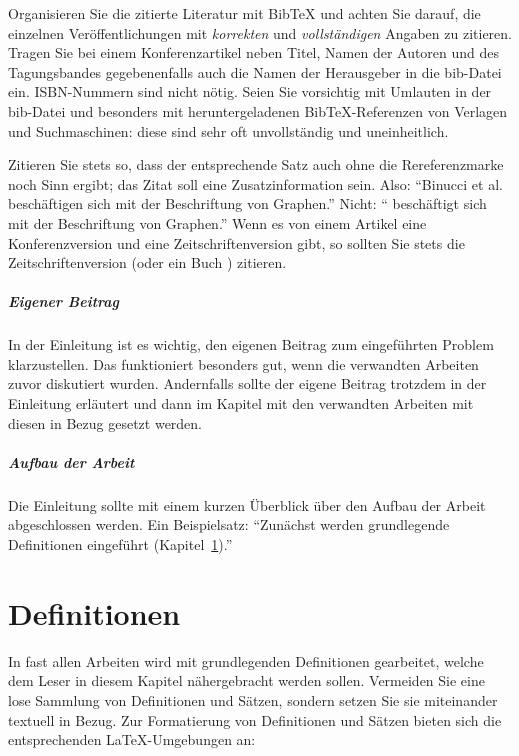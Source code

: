 \documentclass[bachelor,german]{info1thesis}
\begin{document}
Organisieren Sie die zitierte Literatur mit BibTeX und achten Sie darauf, die einzelnen Veröffentlichungen mit \emph{korrekten} und \emph{vollständigen} Angaben zu zitieren.
Tragen Sie bei einem Konferenzartikel neben Titel, Namen der Autoren und des Tagungsbandes gegebenenfalls auch die Namen der Herausgeber in die bib-Datei ein.
ISBN-Nummern sind nicht nötig.
Seien Sie vorsichtig mit Umlauten in der bib-Datei und besonders mit heruntergeladenen BibTeX-Referenzen von Verlagen und Suchmaschinen: diese sind sehr oft unvollständig und uneinheitlich.

Zitieren Sie stets so, dass der entsprechende Satz auch ohne die Rereferenzmarke noch Sinn ergibt; das Zitat soll eine Zusatzinformation sein. 
Also: "`Binucci et al.~\cite{bdln-odgvel-05} beschäftigen sich mit der Beschriftung von Graphen."'
Nicht: "`\cite{bdln-odgvel-05} beschäftigt sich mit der Beschriftung von Graphen."'
Wenn es von einem Artikel eine Konferenzversion \cite{bdln-lhod-02} und eine Zeitschriftenversion \cite{bdln-odgvel-05} gibt, so sollten Sie stets die Zeitschriftenversion (oder ein Buch \cite{gj-cigtn-79}) zitieren.


\paragraph{Eigener Beitrag}
In der Einleitung ist es wichtig, den eigenen Beitrag zum eingeführten Problem klarzustellen.
Das funktioniert besonders gut, wenn die verwandten Arbeiten zuvor diskutiert wurden. 
Andernfalls sollte der eigene Beitrag trotzdem in der Einleitung erläutert und dann im Kapitel mit den verwandten Arbeiten mit diesen in Bezug gesetzt werden.

\paragraph{Aufbau der Arbeit}
Die Einleitung sollte mit einem kurzen Überblick über den Aufbau der Arbeit abgeschlossen werden.
Ein Beispielsatz: "`Zunächst werden grundlegende Definitionen eingeführt (Kapitel~\ref{chap:definitionen})."'


\chapter{Definitionen}
\label{chap:definitionen}
In fast allen Arbeiten wird mit grundlegenden Definitionen gearbeitet, welche dem Leser in diesem Kapitel nähergebracht werden sollen.
Vermeiden Sie eine lose Sammlung von Definitionen und Sätzen, sondern setzen Sie sie miteinander textuell in Bezug.
Zur Formatierung von Definitionen und Sätzen bieten sich die entsprechenden LaTeX-Umgebungen an:
\end{document}
